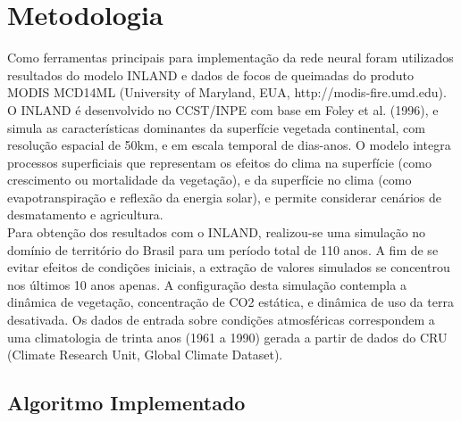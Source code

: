 \documentclass[conference]{IEEEtran}
\begin{document}
\section{Metodologia}
Como ferramentas principais para implementação da rede neural foram utilizados resultados do modelo INLAND e dados de focos de queimadas do produto MODIS MCD14ML (University of Maryland, EUA, http://modis-fire.umd.edu). O INLAND é desenvolvido no CCST/INPE com base em Foley et al. (1996), e simula as características dominantes da superfície vegetada continental, com resolução espacial de 50km, e em escala temporal de dias-anos. O modelo integra processos superficiais que representam os efeitos do clima na superfície (como crescimento ou mortalidade da vegetação), e da superfície no clima (como evapotranspiração e reflexão da energia solar), e permite considerar cenários de desmatamento e agricultura.\\ 
Para obtenção dos resultados com o INLAND, realizou-se uma simulação no domínio de território do Brasil para um período total de 110 anos. A fim de se evitar efeitos de condições iniciais, a extração de valores simulados se concentrou nos últimos 10 anos apenas. A configuração desta simulação contempla a dinâmica de vegetação, concentração de CO2 estática, e dinâmica de uso da terra desativada. Os dados de entrada sobre condições atmosféricas correspondem a uma climatologia de trinta anos (1961 a 1990) gerada a partir de dados do CRU (Climate Research Unit, Global Climate Dataset).\\  


\subsection{Algoritmo Implementado}
\end{document}
